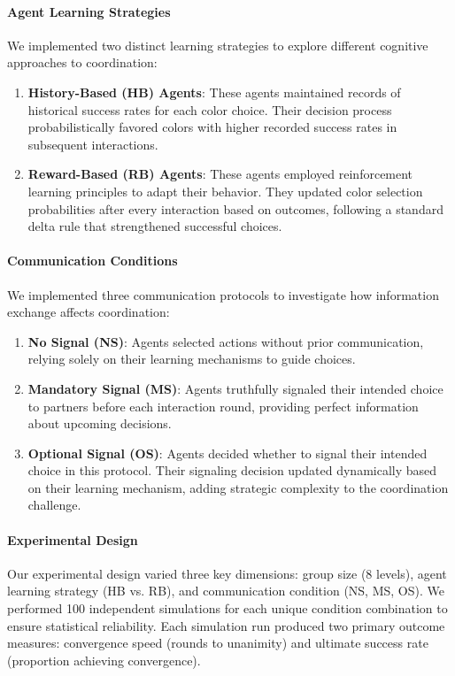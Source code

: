 \documentclass[12pt,a4paper]{article}
\begin{document}
\paragraph{Agent Learning Strategies}
We implemented two distinct learning strategies to explore different cognitive approaches to coordination:
\begin{enumerate}
    \item \textbf{History-Based (HB) Agents}: These agents maintained records of historical success rates for each color choice. Their decision process probabilistically favored colors with higher recorded success rates in subsequent interactions.
    
    \item \textbf{Reward-Based (RB) Agents}: These agents employed reinforcement learning principles to adapt their behavior. They updated color selection probabilities after every interaction based on outcomes, following a standard delta rule that strengthened successful choices.
\end{enumerate}

\paragraph{Communication Conditions} 
We implemented three communication protocols to investigate how information exchange affects coordination:
\begin{enumerate}
    \item \textbf{No Signal (NS)}: Agents selected actions without prior communication, relying solely on their learning mechanisms to guide choices.
    
    \item \textbf{Mandatory Signal (MS)}: Agents truthfully signaled their intended choice to partners before each interaction round, providing perfect information about upcoming decisions.
    
    \item \textbf{Optional Signal (OS)}: Agents decided whether to signal their intended choice in this protocol. Their signaling decision updated dynamically based on their learning mechanism, adding strategic complexity to the coordination challenge.
\end{enumerate}

\paragraph{Experimental Design}
Our experimental design varied three key dimensions: group size (8 levels), agent learning strategy (HB vs. RB), and communication condition (NS, MS, OS). We performed 100 independent simulations for each unique condition combination to ensure statistical reliability. Each simulation run produced two primary outcome measures: convergence speed (rounds to unanimity) and ultimate success rate (proportion achieving convergence).
\end{document}
